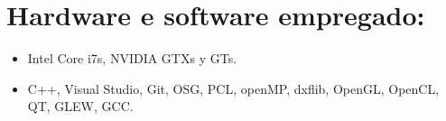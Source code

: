 %
%

\section*{Hardware e software empregado:}

\begin{itemize}
\item Intel Core i7s, NVIDIA GTXs y GTs.
\item C++, Visual Studio, Git, OSG, PCL, openMP, dxflib, OpenGL, OpenCL, QT, GLEW, GCC.
\end{itemize}


